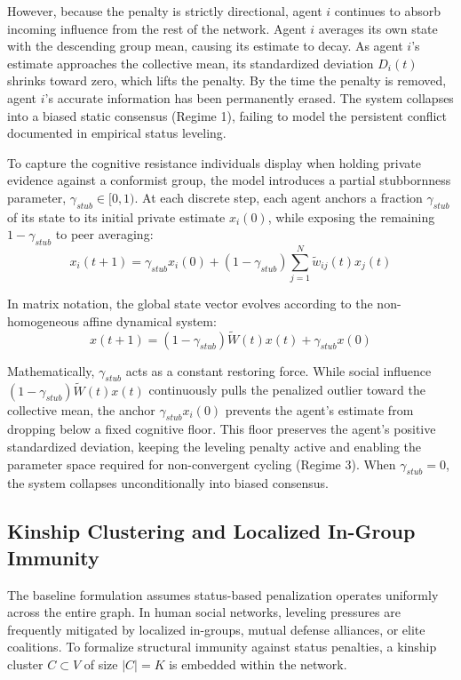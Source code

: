 However, because the penalty is strictly directional, agent $i$ continues to absorb incoming influence from the rest of the network\cite{degroot1974reaching}. Agent $i$ averages its own state with the descending group mean, causing its estimate to decay\cite{degroot1974reaching}. As agent $i$'s estimate approaches the collective mean, its standardized deviation $D_i(t)$ shrinks toward zero, which lifts the penalty\cite{degroot1974reaching}. By the time the penalty is removed, agent $i$'s accurate information has been permanently erased\cite{degroot1974reaching}. The system collapses into a biased static consensus (Regime 1), failing to model the persistent conflict documented in empirical status leveling\cite{degroot1974reaching}.

To capture the cognitive resistance individuals display when holding private evidence against a conformist group, the model introduces a partial stubbornness parameter, $\gamma_{stub} \in [0, 1)$\cite{degroot1974reaching}. At each discrete step, each agent anchors a fraction $\gamma_{stub}$ of its state to its initial private estimate $x_i(0)$, while exposing the remaining $1 - \gamma_{stub}$ to peer averaging\cite{degroot1974reaching}: $$x_i(t+1) = \gamma_{stub} x_i(0) + (1 - \gamma_{stub}) \sum_{j=1}^N \tilde{w}_{ij}(t) x_j(t)$$

In matrix notation, the global state vector evolves according to the non-homogeneous affine dynamical system\cite{acemoglu2013opinion,hajnal1958weak}: $$x(t+1) = (1 - \gamma_{stub}) \tilde{W}(t) x(t) + \gamma_{stub} x(0)$$

Mathematically, $\gamma_{stub}$ acts as a constant restoring force\cite{degroot1974reaching}. While social influence $(1 - \gamma_{stub}) \tilde{W}(t) x(t)$ continuously pulls the penalized outlier toward the collective mean, the anchor $\gamma_{stub} x_i(0)$ prevents the agent's estimate from dropping below a fixed cognitive floor\cite{degroot1974reaching}. This floor preserves the agent's positive standardized deviation, keeping the leveling penalty active and enabling the parameter space required for non-convergent cycling (Regime 3)\cite{degroot1974reaching,acemoglu2013opinion}. When $\gamma_{stub} = 0$, the system collapses unconditionally into biased consensus\cite{degroot1974reaching,acemoglu2013opinion}.

\subsection{Kinship Clustering and Localized In-Group Immunity}
The baseline formulation assumes status-based penalization operates uniformly across the entire graph\cite{degroot1974reaching}. In human social networks, leveling pressures are frequently mitigated by localized in-groups, mutual defense alliances, or elite coalitions\cite{degroot1974reaching,hajnal1958weak}. To formalize structural immunity against status penalties, a kinship cluster $C \subset V$ of size $|C| = K$ is embedded within the network\cite{degroot1974reaching}.


